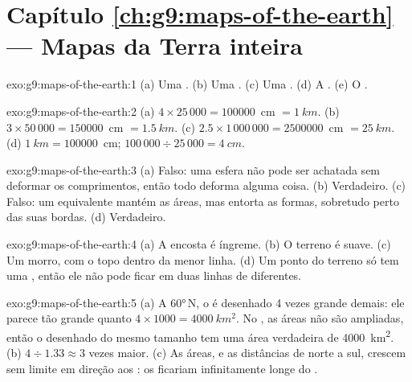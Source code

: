 \section*{Capítulo \ref{ch:g9:maps-of-the-earth} --- Mapas da Terra inteira}

\begin{solution}{exo:g9:maps-of-the-earth:1}
(a) Uma . (b) Uma . (c) Uma . (d) A . (e) O .
\end{solution}

\begin{solution}{exo:g9:maps-of-the-earth:2}
(a) $4 \times 25\,000 = \num{100000}$~cm $= \qty{1}{km}$. (b) $3 \times
50\,000 = \num{150000}$~cm $= \qty{1.5}{km}$. (c) $2.5 \times 1\,000\,000
= \num{2500000}$~cm $= \qty{25}{km}$. (d) $\qty{1}{km} = \num{100000}$~cm;
$100\,000 \div 25\,000 = \qty{4}{cm}$.
\end{solution}

\begin{solution}{exo:g9:maps-of-the-earth:3}
(a) Falso: uma esfera não pode ser achatada sem deformar os comprimentos,
então todo  deforma alguma coisa. (b) Verdadeiro. (c) Falso: um
 equivalente mantém as áreas, mas entorta as formas, sobretudo perto
das suas bordas. (d) Verdadeiro.
\end{solution}

\begin{solution}{exo:g9:maps-of-the-earth:4}
(a) A encosta é íngreme. (b) O terreno é suave. (c) Um morro, com o topo
dentro da menor linha. (d) Um ponto do terreno só tem uma , então
ele não pode ficar em duas linhas de  diferentes.
\end{solution}

\begin{solution}{exo:g9:maps-of-the-earth:5}
(a) A \ang{60}\,N, o  é desenhado 4 vezes grande demais: ele parece
tão grande quanto
$4 \times 1000 = \qty{4000}{km^2}$. No , as áreas não são
ampliadas, então o  desenhado do mesmo tamanho tem uma área
verdadeira de \qty{4000}{km^2}. (b) $4 \div 1.33 \approx 3$ vezes maior.
(c) As áreas, e as distâncias de norte a sul, crescem sem limite em
direção aos : os  ficariam infinitamente longe do .
\end{solution}

